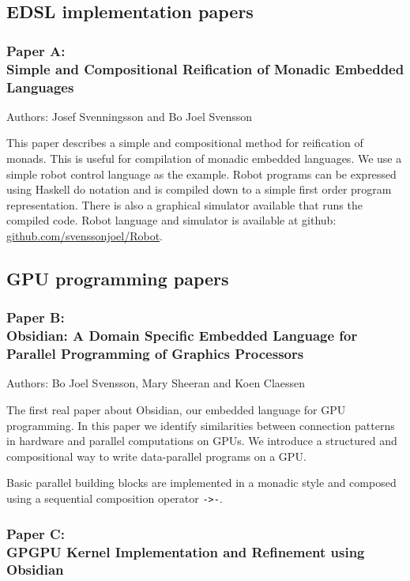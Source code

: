 \documentclass[a4paper]{book}
\newcommand{\paperA}{Paper A}
\newcommand{\paperATitle}{Simple and Compositional Reification of Monadic Embedded Languages}
\newcommand{\paperB}{Paper B}
\newcommand{\paperBTitle}{Obsidian: A Domain Specific Embedded Language for Parallel Programming of Graphics Processors}
\newcommand{\paperC}{Paper C}
\newcommand{\paperCTitle}{GPGPU Kernel Implementation and Refinement using Obsidian}
\begin{document}
\subsection{EDSL implementation papers} 

\subsubsection{\paperA: \\ \paperATitle} 

Authors: Josef Svenningsson and Bo Joel Svensson 

\vspace{5mm}

\noindent This paper describes a simple and compositional method for 
reification of monads. This is useful for compilation of 
monadic embedded languages. We use a simple robot control language 
as the example. Robot programs can be expressed using Haskell do notation 
and is compiled down to a simple first order program representation. 
There is also a graphical simulator available that runs the compiled 
code. Robot language and simulator is available at github: \url{github.com/svenssonjoel/Robot}.

\subsection{GPU programming papers} 

\subsubsection{\paperB: \\ \paperBTitle}

Authors: Bo Joel Svensson, Mary Sheeran and Koen Claessen \newline

\vspace{5mm}

The first real paper about Obsidian, our embedded language for GPU 
programming. In this paper we identify similarities between 
connection patterns in hardware and parallel computations on GPUs. 
We introduce a structured and compositional way to write data-parallel 
programs on a GPU.

Basic parallel building blocks are implemented in a monadic style and 
composed using a sequential composition operator {\tt ->-}. 

\subsubsection{\paperC: \\ \paperCTitle}
\end{document}
